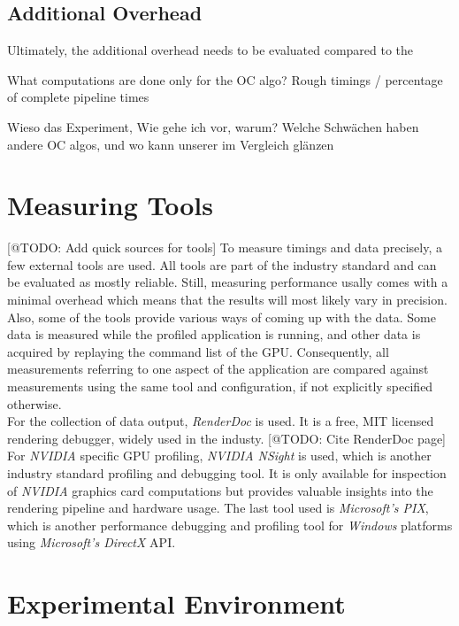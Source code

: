 \subsection*{Additional Overhead}

Ultimately, the additional overhead needs to be evaluated compared to the 

What computations are done only for the OC algo?
Rough timings / percentage of complete pipeline times


Wieso das Experiment,
Wie gehe ich vor, warum?
Welche Schwächen haben andere OC algos, und wo kann unserer im Vergleich glänzen


\section{Measuring Tools}
[@TODO: Add quick sources for tools]
To measure timings and data precisely, a few external tools are used. All tools are part of the industry 
standard and can be evaluated as mostly reliable. Still, measuring performance usally comes with a minimal 
overhead which means that the results will most likely vary in precision. Also, some of the tools provide 
various ways of coming up with the data. Some data is measured while the profiled application is running, 
and other data is acquired by replaying the command list of the \ac{GPU}. Consequently, all measurements 
referring to one aspect of the application are compared against measurements using the same tool and 
configuration, if not explicitly specified otherwise. \\

\noindent
For the collection of data output, \emph{RenderDoc} is used. It is a free, MIT licensed rendering debugger,
widely used in the industy. [@TODO: Cite RenderDoc page]
For \emph{NVIDIA} specific \ac{GPU} profiling, \emph{NVIDIA NSight} is used, which is another industry standard 
profiling and debugging tool. It is only available for inspection of \emph{NVIDIA} graphics card computations but 
provides valuable insights into the rendering pipeline and hardware usage. 
The last tool used is \emph{Microsoft's PIX}, which is another performance debugging and profiling tool for 
\emph{Windows} platforms using \emph{Microsoft's DirectX} \ac{API}.


\section{Experimental Environment} \label{sec-experimental-environment}

